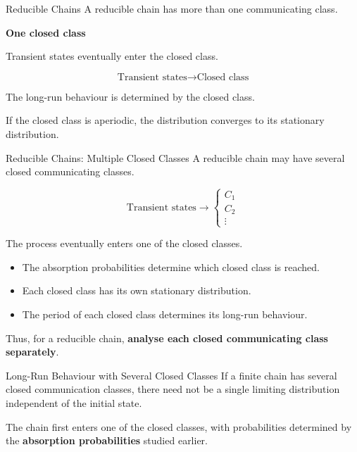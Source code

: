 \documentclass[
  ignorenonframetext,
  aspectratio=169,
]{beamer}
\providecommand{\tightlist}{%
  \setlength{\itemsep}{0pt}\setlength{\parskip}{0pt}}
\begin{document}
\begin{frame}{Reducible Chains}
\protect{}\label{reducible-chains}
A reducible chain has more than one communicating class.

\textbf{One closed class}

Transient states eventually enter the closed class.

\[
\text{Transient states}
\longrightarrow
\boxed{\text{Closed class}}
\]

The long-run behaviour is determined by the closed class.

If the closed class is aperiodic, the distribution converges to its
stationary distribution.
\end{frame}

\begin{frame}{Reducible Chains: Multiple Closed Classes}
\protect{}\label{reducible-chains-multiple-closed-classes}
A reducible chain may have several closed communicating classes.

\[
\text{Transient states}
\longrightarrow
\begin{cases}
\boxed{C_1}\\
\boxed{C_2}\\
\vdots
\end{cases}
\]

The process eventually enters one of the closed classes.

\begin{itemize}
\tightlist
\item
  The absorption probabilities determine which closed class is reached.
\item
  Each closed class has its own stationary distribution.
\item
  The period of each closed class determines its long-run behaviour.
\end{itemize}

Thus, for a reducible chain, \textbf{analyse each closed communicating
class separately}.
\end{frame}

\begin{frame}{Long-Run Behaviour with Several Closed Classes}
\protect{}\label{long-run-behaviour-with-several-closed-classes}
If a finite chain has several closed communication classes, there need
not be a single limiting distribution independent of the initial state.

The chain first enters one of the closed classes, with probabilities
determined by the \textbf{absorption probabilities} studied earlier.
\end{frame}
\end{document}
